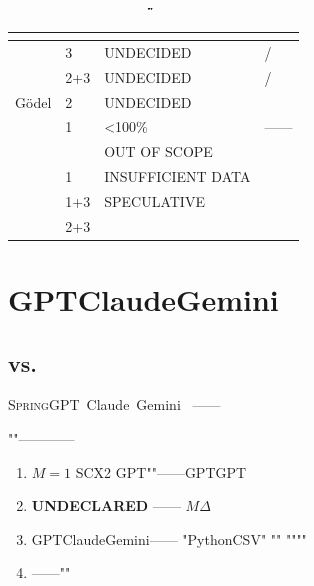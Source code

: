 \documentclass[12pt,a4paper]{article}
\theoremstyle{remark}
\newcommand{\Spring}{\textsc{Spring}}
\begin{document}
\begin{table}[H]
\centering
\caption{Spring}
\label{tab:honest_declaration}
\renewcommand{\arraystretch}{1.5}
\small
\begin{tabular}{p{3.5cm} p{3.5cm} p{3.5cm} p{3cm}}
\toprule
\textbf{} & \textbf{} & \textbf{} & \textbf{} \\
\midrule
 & 3 & UNDECIDED & / \\
 & 2+3 & UNDECIDED & / \\
G\"odel & 2 & UNDECIDED &  \\
 & 1 & <100\% & —— \\
 &  & OUT OF SCOPE &  \\
 & 1 & INSUFFICIENT DATA &  \\
 & 1+3 & SPECULATIVE &  \\
 & 2+3 &  &  \\
\bottomrule
\end{tabular}
\caption*{\footnotesize \"\"\"\"\"\"
}
\end{table}

\newpage

\section{GPTClaudeGemini}

\subsection{ vs. }

\Spring{}GPT~\cite{brown2020}Claude~\cite{anthropic2024}Gemini~\cite{gemini2023}
——

""————


\begin{enumerate}[label=(\arabic*), itemsep=5pt]
    \item \textbf{$M=1$} 
    \textbf{}
    SCX2
    GPT""——GPTGPT
    
    \item \textbf{UNDECLARED} ——
    $M$$\Delta$
    
    
    \item \textbf{} GPTClaudeGemini——
    "PythonCSV"
    ""
    """"
    
    \item \textbf{} 
    
    \textbf{}——""
\end{enumerate}
\end{document}
